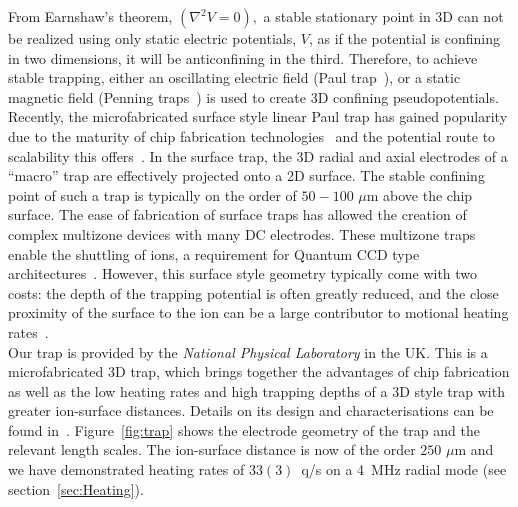     From Earnshaw's theorem,
    $(\nabla^2 V = 0),$ a stable stationary point in 3D can not be realized
    using only static electric potentials, $V$, as if the potential is confining
    in two dimensions, it will be anticonfining in the third. Therefore, to
    achieve stable trapping, either an oscillating electric field (Paul
    trap~\cite{XXX}), or a static magnetic field (Penning traps~\cite{XXX}) is
    used to create 3D confining pseudopotentials.\\
    Recently, the microfabricated surface style linear Paul trap has gained
    popularity due to the maturity of chip fabrication
    technologies~\cite{allcock_surface-electrode_2011} and the potential route
    to scalability this offers~\cite{kielpinski_architecture_2002}. In the surface trap, the 3D radial and axial
    electrodes of a ``macro'' trap are effectively projected onto a 2D surface.
    The stable confining point of such a trap is typically on the order of $50-100$ $\mu$m
    above the chip surface. The ease of fabrication of surface traps has allowed
    the creation of complex multizone devices with many DC electrodes.  These
    multizone traps enable the shuttling of ions, a requirement for Quantum CCD
    type architectures~\cite{kielpinski_architecture_2002}. However, this
    surface style geometry typically come with two costs: the depth of the
    trapping potential is often greatly reduced, and the close proximity of the
    surface to the ion can be a large contributor to motional heating
    rates~\cite{turchette_heating_2000}. \\
    Our trap is provided by the \emph{National Physical Laboratory} in the UK. This is a microfabricated 3D trap, which brings together the
    advantages of chip fabrication as well as the low heating rates and high
    trapping depths of a 3D style trap with greater ion-surface distances. Details on its design and characterisations can be found in~\cite{see_fabrication_2013,
    wilpers_monolithic_2012}. Figure~\ref{fig:trap} shows the electrode geometry of the trap and the relevant length scales.
    The ion-surface distance is now of the order $250$ $\mu$m and we have
    demonstrated heating rates of $ 33(3)$~q/s on a 4~MHz radial mode (see
    section~\ref{sec:Heating}).\\

